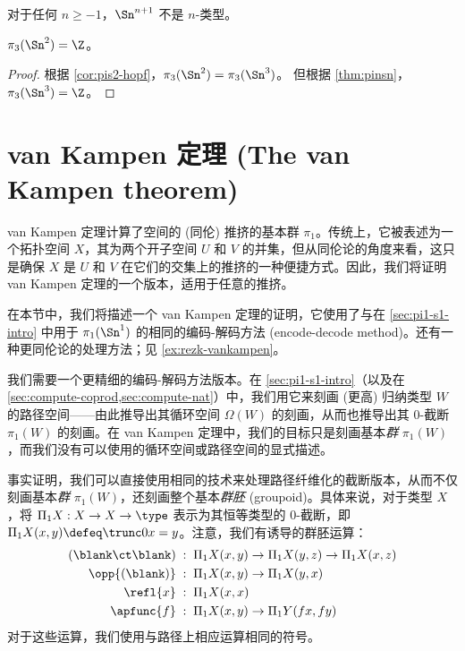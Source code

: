 {\begin{cor}
  对于任何 $n\ge -1$，$\Sn^{n+1}$ 不是 $n$-类型。
\end{cor}

\begin{cor}\label{thm:pi3s2}
$\pi_3(\Sn^2)=\Z$。
\end{cor}
\begin{proof}
  根据 \cref{cor:pis2-hopf}，$\pi_3(\Sn^2) = \pi_3(\Sn^3)$。
  但根据 \cref{thm:pinsn}，$\pi_3(\Sn^3) = \Z$。
\end{proof}
\section{van Kampen 定理 (The van Kampen theorem)}
\label{sec:van-kampen}

%
%

%
van Kampen 定理计算了空间的 (同伦) 推挤的基本群 $\pi_1$。传统上，它被表述为一个拓扑空间 $X$，其为两个开子空间 $U$ 和 $V$ 的并集，但从同伦论的角度来看，这只是确保 $X$ 是 $U$ 和 $V$ 在它们的交集上的推挤的一种便捷方式。因此，我们将证明 van Kampen 定理的一个版本，适用于任意的推挤。

在本节中，我们将描述一个 van Kampen 定理的证明，它使用了与在 \cref{sec:pi1-s1-intro} 中用于 $\pi_1(\Sn^1)$ 的相同的编码-解码方法 (encode-decode method)。还有一种更同伦论的处理方法；见 \cref{ex:rezk-vankampen}。

我们需要一个更精细的编码-解码方法版本。在 \cref{sec:pi1-s1-intro}（以及在 \cref{sec:compute-coprod,sec:compute-nat}）中，我们用它来刻画 (更高) 归纳类型 $W$ 的路径空间——由此推导出其循环空间 $\Omega(W)$ 的刻画，从而也推导出其 0-截断 $\pi_1(W)$ 的刻画。在 van Kampen 定理中，我们的目标只是刻画基本\emph{群} $\pi_1(W)$，而我们没有可以使用的循环空间或路径空间的显式描述。

事实证明，我们可以直接使用相同的技术来处理路径纤维化的截断版本，从而不仅刻画基本\emph{群} $\pi_1(W)$，还刻画整个基本\emph{群胚} (groupoid)。具体来说，对于类型 $X$，将 $\Pi_1 X: X\to X\to \type$ 表示为其恒等类型的 $0$-截断，即 $\Pi_1 X(x,y) \defeq \trunc0{x=y}$。注意，我们有诱导的群胚运算：
\begin{align*}
(\blank\ct\blank) &\;:\; \Pi_1X(x,y) \to \Pi_1X(y,z) \to \Pi_1X(x,z)\\
\opp{(\blank)} &\;:\; \Pi_1X(x,y) \to \Pi_1X(y,x)\\
\refl{x} &\;:\; \Pi_1X(x,x)\\
\apfunc{f} &\;:\; \Pi_1X(x,y) \to \Pi_1Y(fx,fy)
\end{align*}
对于这些运算，我们使用与路径上相应运算相同的符号。

}
